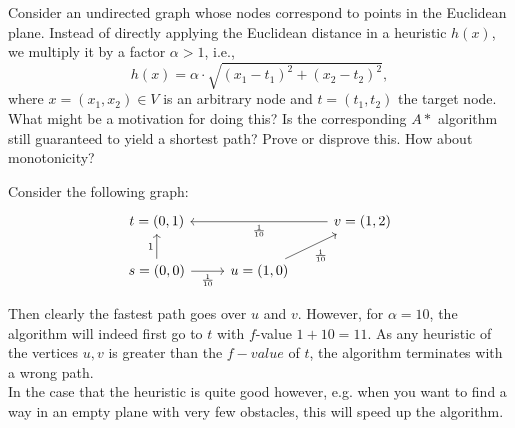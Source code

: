 \documentclass{article}
\begin{document}
\newpage

\begin{exercise}
    Consider an undirected graph whose nodes correspond to points in the Euclidean plane. Instead of directly applying the Euclidean distance in a heuristic $h(x)$, we multiply it by a factor $\alpha>1$, i.e.,
    \begin{equation*}
        h(x) = \alpha \cdot \sqrt{
            (x_1-t_1)^2+(x_2-t_2)^2
        },   
    \end{equation*}
    where $x= (x_1,x_2)\in V$ is an arbitrary node and $t= (t_1,t_2)$ the target node. What might be a motivation for doing this? Is the corresponding $A*$ algorithm still guaranteed to yield a shortest path? Prove or disprove this. How about monotonicity?
\end{exercise}
\begin{solving}
    Consider the following graph:
    \[
\begin{tikzcd}
    t = (0,1)&&v = (1,2)\arrow[ll, "\frac1{10}"]\\
    s=(0,0)\arrow[r, "\frac1{10}"']\arrow[u, "1"]&u = (1,0)\arrow[ur, "\frac1{10}"']
\end{tikzcd}
    \]
\end{solving}
Then clearly the fastest path goes over $u$ and $v$. However, for $\alpha = 10$, the algorithm will indeed first go to $t$ with $f$-value $1+10 = 11$. As any heuristic of the vertices $u,v$ is greater than the $f-value$ of $t$, the algorithm terminates with a wrong path.\\
In the case that the heuristic is quite good however, e.g. when you want to find a way in an empty plane with very few obstacles, this will speed up the algorithm.

\newpage
\end{document}

